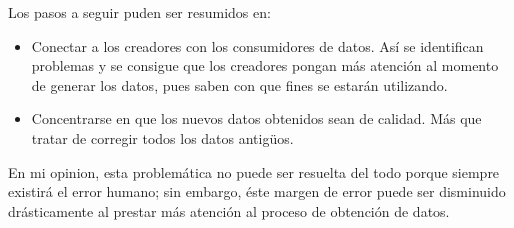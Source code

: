 \documentclass{article}
\begin{document}
Los pasos a seguir puden ser resumidos en:
\begin{itemize}
    \item Conectar a los creadores con los consumidores de datos. Así se identifican problemas y se consigue que los creadores 
    pongan más atención al momento de generar los datos, pues saben con que fines se estarán utilizando.
    \item Concentrarse en que los nuevos datos obtenidos sean de calidad. Más que tratar de corregir todos los datos antigüos.
\end{itemize}

En mi opinion, esta problemática no puede ser resuelta del todo porque siempre existirá el error humano; sin embargo, éste 
margen de error puede ser disminuido drásticamente al prestar más atención al proceso de obtención de datos.
\end{document}
